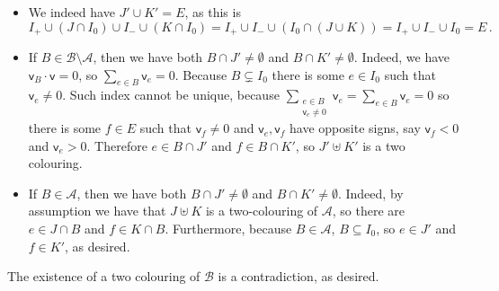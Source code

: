 \documentclass[kulak]{tplt}
\theoremstyle{definition}
\newcommand{\vv}{\mathsf{v}}
\begin{document}
\begin{enumerate}
\begin{itemize}
\item We indeed have $J' \cup K' = E$, as this is 
$$I_+ \cup (J \cap I_0) \cup I_- \cup (K \cap I_0) = I_+ \cup I_- \cup (I_0 \cap (J \cup K)) = I_+ \cup I_- \cup I_0 = E\, . $$

\item If $B \in \mathcal B \setminus \mathcal A$, then we have both $B \cap J' \neq \emptyset $ and $B \cap K' \neq \emptyset $.
Indeed, we have $\vv_B \cdot \vv = 0 $, so $\sum_{e\in B} \vv_e = 0$.
Because $B \subsetneq I_0$ there is some $e \in I_0$ such that $\vv_e \neq 0$.
Such index cannot be unique, because $\sum_{\substack{e\in B \\ \vv_e \neq 0}} \vv_e  = \sum_{e\in B} \vv_e = 0$ so there is some $f \in E$ such that $\vv_f\neq 0 $ and $\vv_e, \vv_f$ have opposite signs, say $\vv_f <0 $ and $\vv_e > 0$.
Therefore $e \in B \cap J'$ and $f \in B \cap K'$, so $J'\uplus K' $ is a two colouring.

\item If $B \in \mathcal A$, then we have both $B \cap J' \neq \emptyset $ and $B \cap K' \neq \emptyset $.
Indeed, by assumption we have that  $J\uplus K $ is a two-colouring of $\mathcal A$, so there are $e \in J\cap B$ and $f\in K\cap B$.
Furthermore, because $B \in \mathcal A$, $B \subseteq I_0$, so $e \in J'$ and $f \in K'$, as desired. 
\end{itemize}

The existence of a two colouring of $\mathcal B$ is a contradiction, as desired.
\end{enumerate}
\end{document}
